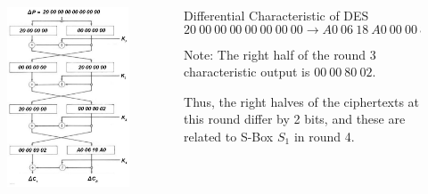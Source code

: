 \documentclass[9pt]{beamer}
\begin{document}
\begin{frame}
\begin{columns}
\begin{column}{0.4\textwidth}
\begin{figure}
\includegraphics[totalheight=0.8\textheight]{des_diff_char.jpg}
\end{figure}
\end{column}

\begin{column}{0.6\textwidth}
Differential Characteristic of DES
\[ 20\:00\:00\:00\:00\:00\:00\:00 \rightarrow A0\:06\:18\:A0\:00\:00\:80\:02 \]

\pause Note: The right half of the round 3 characteristic output is $00\:00\:80\:02$. 

\vspace{2mm}
\pause Thus, the right halves of the ciphertexts at this round differ by 2 bits, and these are related to S-Box $S_1$ in round 4.


\end{column}
\end{columns}
\end{frame}
\end{document}
